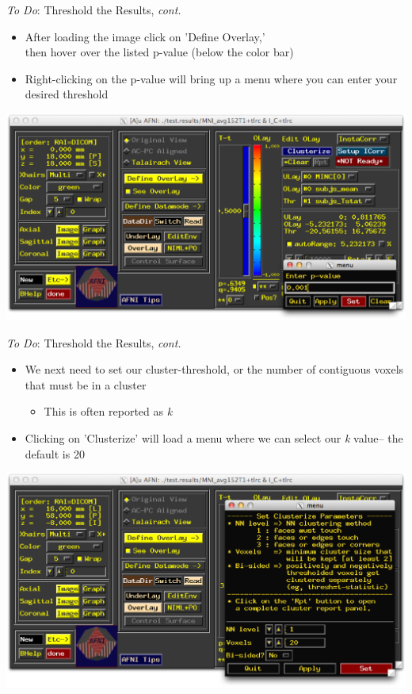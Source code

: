 \documentclass[t,12pt]{beamer}
\begin{document}
\begin{frame}{\emph{To Do}: Threshold the Results, \textit{cont.}}
\vspace{10pt}
\begin{itemize}
\setlength\itemsep{1em}
\item After loading the image click on 'Define Overlay,' \\ then hover over the listed p-value (below the color bar)
\item Right-clicking on the p-value will bring up a menu where you can enter your desired threshold
\end{itemize}
\vspace{4pt}
\centering
\includegraphics[width=.65\textwidth]{images/set_thresh.png}
\end{frame}

\begin{frame}{\emph{To Do}: Threshold the Results, \textit{cont.}}
\vspace{10pt}
\begin{itemize}
\setlength\itemsep{1em}
\item We next need to set our cluster-threshold, or the number of contiguous voxels that must be in a cluster
\vspace{4pt}
\begin{itemize}
\item This is often reported as \textit{k}
\end{itemize}
\item Clicking on 'Clusterize' will load a menu where we can select our \textit{k} value-- the default is 20
\end{itemize}
\vspace{4pt}
\centering
\includegraphics[width=.65\textwidth]{images/clusterize.png}
\end{frame}
\end{document}
